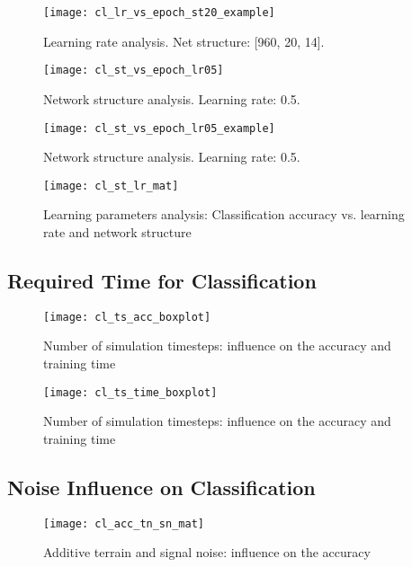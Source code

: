 \begin{figure}[H]
  \centering
  \texttt{[image: cl\_lr\_vs\_epoch\_st20\_example]}
  \caption{Learning rate analysis. Net structure: [960, 20, 14].}
  \label{fig:lr_analysis_example}
\end{figure}

\begin{figure}[H]
  \centering
  \texttt{[image: cl\_st\_vs\_epoch\_lr05]}
  \caption{Network structure analysis. Learning rate: 0.5.}
  \label{fig:st_analysis}
\end{figure}

\begin{figure}[H]
  \centering
  \texttt{[image: cl\_st\_vs\_epoch\_lr05\_example]}
  \caption{Network structure analysis. Learning rate: 0.5.}
  \label{fig:st_analysis_example}
\end{figure}

\begin{figure}[H]
  \centering
  \texttt{[image: cl\_st\_lr\_mat]}
  \caption{Learning parameters analysis: Classification accuracy vs. learning rate and network structure}
  \label{fig:acc_st_lr_mat}
\end{figure}

\subsection{Required Time for Classification} \label{ssec:number_of_timesteps}

\begin{figure}[H]
  \centering
  \texttt{[image: cl\_ts\_acc\_boxplot]}
  \caption{Number of simulation timesteps: influence on the accuracy and training time}
  \label{fig:ts_acc_boxplot}
\end{figure}

\begin{figure}[H]
  \centering
  \texttt{[image: cl\_ts\_time\_boxplot]}
  \caption{Number of simulation timesteps: influence on the accuracy and training time}
  \label{fig:ts_time_boxplot}
\end{figure}

\subsection{Noise Influence on Classification} \label{ssec:final_configuration}

\begin{figure}[H]
  \centering
  \texttt{[image: cl\_acc\_tn\_sn\_mat]}
  \caption{Additive terrain and signal noise: influence on the accuracy}
  \label{fig:acc_tn_sn_mat}
\end{figure}

